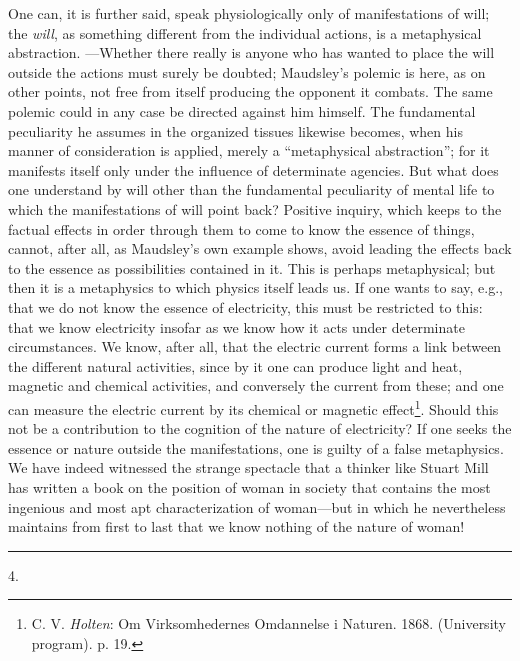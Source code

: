 \documentclass[12pt,a4paper,openany]{book}
\newcommand{\secnum}[1]{\par\begin{center}#1\end{center}\par\nobreak}
\newcommand{\opage}[1]{\marginnote{\footnotesize\textit{[#1]}}}
\begin{document}
One can, it is further said, speak physiologically only
of manifestations of will; the \emph{will}, as something different
from the individual actions, is a metaphysical abstraction.
---Whether there really is anyone who has wanted to place
the will outside the actions must surely be doubted; Maudsley's
polemic is here, as on other points, not free from itself
producing the opponent it combats. The same polemic
could in any case be directed against him
himself. The fundamental peculiarity he assumes in the
organized tissues likewise becomes, when his manner of consideration is applied,
merely a ``metaphysical abstraction''; for it manifests
itself only under the influence of determinate agencies. But
what does one understand by will other than the fundamental peculiarity
of mental life to which the manifestations of will point
back? Positive inquiry, which keeps to the factual
effects in order through them to come to know the essence of things,
cannot, after all, as Maudsley's own example shows, avoid
leading the effects back to the essence as possibilities
contained in it. This is perhaps metaphysical; but then it
is a metaphysics to which physics itself leads us. If
one wants to say, e.g., that we do not know the essence of electricity,
this must be restricted to this: that we know electricity
insofar as we know how it acts under determinate circumstances.
We know, after all, that the electric current forms
a link between the different natural activities, since
by it one can produce light and heat, magnetic and
chemical activities, and conversely the current from these; and one
can measure the electric current by its chemical or magnetic
effect\footnote{C. V. \emph{Holten}: Om Virksomhedernes Omdannelse i Naturen. 1868. (University program). p. 19.}. Should this not be a contribution to the
cognition of the nature of electricity? If one seeks the essence
\opage{322}or nature outside the manifestations, one is guilty
of a false metaphysics. We have indeed witnessed the strange spectacle that a
thinker like Stuart Mill has written a book on the position of woman
in society that contains the most ingenious and most
apt characterization of woman---but in which he nevertheless
maintains from first to last that we know nothing of the nature
of woman!

\begin{center}\rule{1.8cm}{0.4pt}\end{center}

\secnum{4.}
\end{document}

